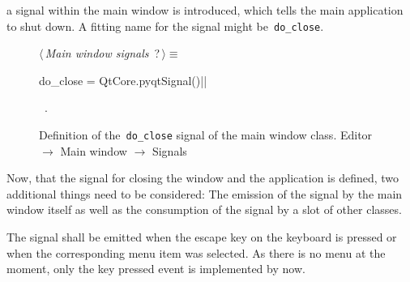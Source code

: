 \documentclass[%
    a4paper,    %
    justified,  %
    nobib,      %
    openany     %
]{tufte-book}
\makeatletter
\renewcommand{\label}[1]{\@tufte@label{##1}}%
\makeatother
\begin{document}
 a signal within the main window is
introduced, which tells the main application to shut down. A fitting name for
the signal might be~\verb=do_close=.

\begin{figure}
\begin{flushleft} \small
\begin{minipage}{\linewidth}\label{scrap16}\raggedright\small
{} $\langle\,${\itshape Main window signals}\nobreak\ {\footnotesize {?}}$\,\rangle\equiv$
\vspace{-1ex}
\begin{pythoncode}
do_close = QtCore.pyqtSignal()|\NWsep|
\end{pythoncode}
\vspace{1.5ex}
\footnotesize
\begin{list}{}{\setlength{\itemsep}{-\parsep}\setlength{\itemindent}{-\leftmargin}}
\item \NWtxtMacroRefIn\ .

\item{}
\end{list}
\end{minipage}\vspace{4ex}
\end{flushleft}
\caption{Definition of the~\texttt{do\_close} signal of the main window class.
  \newline{}\newline{}Editor $\rightarrow$ Main window $\rightarrow$ Signals}
\label{editor:lst:main-window:signals}
\end{figure}

Now, that the signal for closing the window and the application is defined, two
additional things need to be considered: The emission of the signal by
the main window itself as well as the consumption of the signal by a slot of
other classes.

The signal shall be emitted when the escape key on the keyboard is pressed or
when the corresponding menu item was selected. As there is no menu at the
moment, only the key pressed event is implemented by now.
\end{document}
